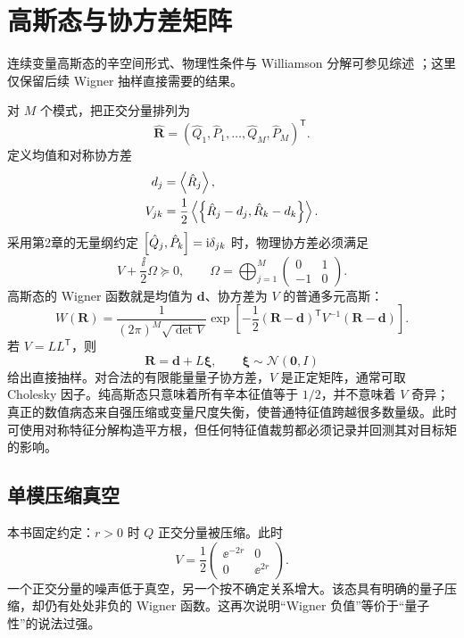 \section{高斯态与协方差矩阵}

连续变量高斯态的辛空间形式、物理性条件与 Williamson 分解可参见综述
\cite{Weedbrook2012}；这里仅保留后续 Wigner 抽样直接需要的结果。

对 $M$ 个模式，把正交分量排列为
\begin{equation}
  \hat{\bm R}=(\hat Q_1,\hat P_1,\ldots,\hat Q_M,\hat P_M)^{\mathsf T}.
\end{equation}
定义均值和对称协方差
\begin{align}
  d_j&=\left\langle \hat R_j\right\rangle,\\
  V_{jk}&=\frac12\left\langle 
  \left\{\hat R_j-d_j,\hat R_k-d_k\right\}\right\rangle.
  \label{eq:gaussian-covariance}
\end{align}
采用第2章的无量纲约定 $\left[\hat Q_j,\hat P_k\right]=\mathrm{i}\delta_{jk}$ 时，物理协方差必须满足
\begin{equation}
  V+\frac{\ii}{2}\Omega\succeq0,
  \qquad
  \Omega=\bigoplus_{j=1}^{M}
  \begin{pmatrix}0&1\\-1&0\end{pmatrix}.
  \label{eq:uncertainty-matrix}
\end{equation}
高斯态的 Wigner 函数就是均值为 $\bm d$、协方差为 $V$ 的普通多元高斯：
\begin{equation}
  W(\bm R)=\frac{1}{(2\pi)^M\sqrt{\det V}}
  \exp\!\left[-\frac12(\bm R-\bm d)^{\mathsf T}
  V^{-1}(\bm R-\bm d)\right].
  \label{eq:multimode-gaussian-wigner}
\end{equation}
若 $V=LL^{\mathsf T}$，则
\begin{equation}
  \bm R=\bm d+L\bm\xi,
  \qquad \bm\xi\sim\mathcal{N}(\bm0,I)
  \label{eq:gaussian-cholesky-sampling}
\end{equation}
给出直接抽样。对合法的有限能量量子协方差，$V$ 是正定矩阵，通常可取 Cholesky 因子。纯高斯态只意味着所有辛本征值等于 $1/2$，并不意味着 $V$ 奇异；真正的数值病态来自强压缩或变量尺度失衡，使普通特征值跨越很多数量级。此时可使用对称特征分解构造平方根，但任何特征值裁剪都必须记录并回测其对目标矩的影响。

\subsection{单模压缩真空}

本书固定约定：$r>0$ 时 $Q$ 正交分量被压缩。此时
\begin{equation}
  V=\frac12
  \begin{pmatrix}
    \ee^{-2r}&0\\
    0&\ee^{2r}
  \end{pmatrix}.
  \label{eq:squeezed-covariance}
\end{equation}
一个正交分量的噪声低于真空，另一个按不确定关系增大。该态具有明确的量子压缩，却仍有处处非负的 Wigner 函数。这再次说明“Wigner 负值”等价于“量子性”的说法过强。

